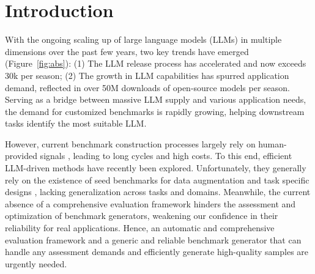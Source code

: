 \section{Introduction}
\label{sec:intro}

With the ongoing scaling up of large language models (LLMs) in multiple dimensions over the past few years, two key trends have emerged (Figure~\ref{fig:abs}): 
(1) The LLM release process has accelerated and now exceeds 30k per season; (2) The growth in LLM capabilities has spurred application demand, reflected in over 50M downloads of open-source models per season.
Serving as a bridge between massive LLM supply and various application needs, the demand for customized benchmarks is rapidly growing, helping downstream tasks identify the most suitable LLM. 

However, current benchmark construction processes largely rely on human-provided signals \citep{evalsurvey,mmlupro}, leading to long cycles and high costs. To this end, efficient LLM-driven methods have recently been explored. 
Unfortunately, they generally rely on the existence of seed benchmarks for data augmentation \citep{dyval2,unigen,perteval,databench} and task specific designs \citep{dyval,s3eval}, lacking generalization across tasks and domains. 
Meanwhile, the current absence of a comprehensive evaluation framework hinders the assessment and optimization of benchmark generators, weakening our confidence in their reliability for real applications.
Hence, an automatic and comprehensive evaluation framework and a generic and reliable benchmark generator that can handle any assessment demands and efficiently generate high-quality samples are urgently needed.

